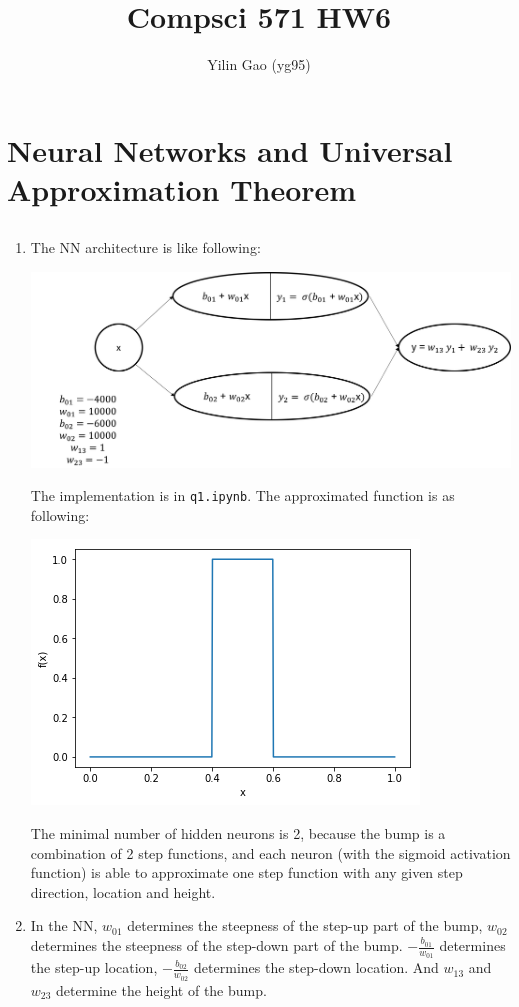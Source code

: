 \documentclass[paper=letter, fontsize=12pt]{article}
\title{Compsci 571 HW6}
\author{Yilin Gao (yg95)}
\begin{document}
\maketitle
\section{Neural Networks and Universal Approximation Theorem}

\subsection{}

\begin{enumerate}[label=(\alph*)]
	\item The NN architecture is like following:
			
	\includegraphics[scale=0.4]{q1a.png}
			 
	The implementation is in \verb|q1.ipynb|. The approximated function is as following:
	
	\includegraphics[scale=0.6]{q1a2.png}
			 
	The minimal number of hidden neurons is 2, because the bump is a combination of 2 step functions, and each neuron (with the sigmoid activation function) is able to approximate one step function with any given step direction, location and height.
	
	\item In the NN, $w_{01}$ determines the steepness of the step-up part of the bump, $w_{02}$ determines the steepness of the step-down part of the bump. $-\frac{b_{01}}{w_{01}}$ determines the step-up location, $-\frac{b_{02}}{w_{02}}$ determines the step-down location. And $w_{13}$ and $w_{23}$ determine the height of the bump.
\end{enumerate}
\end{document}
